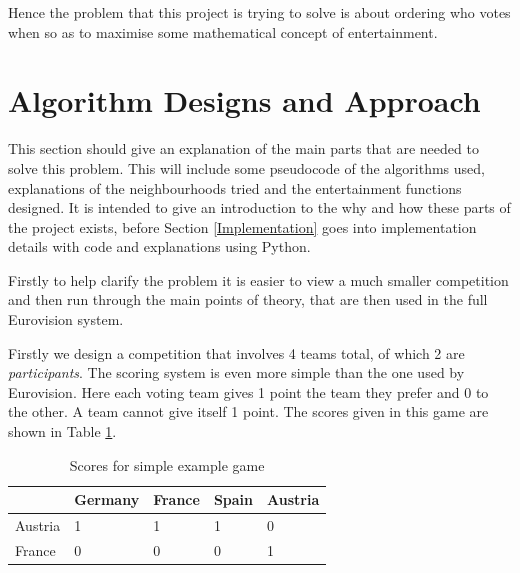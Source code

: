 \documentclass[12pt]{report}
\begin{document}
Hence the problem that this project is trying to solve is about ordering who votes when so as to maximise some mathematical concept of entertainment.

\clearpage
\section{Algorithm Designs and Approach}\label{AlgorithmDesigns}
This section should give an explanation of the main parts that are needed to solve this problem. This will include some pseudocode of the algorithms used, explanations of the neighbourhoods tried and the entertainment functions designed. It is intended to give an introduction to the why and how these parts of the project exists, before Section \ref{Implementation} goes into implementation details with code and explanations using Python.

Firstly to help clarify the problem it is easier to view a much smaller competition and then run through the main points of theory, that are then used in the full Eurovision system.

Firstly we design a competition that involves 4 teams total, of which 2 are \textit{participants}. The scoring system is even more simple than the one used by Eurovision. Here each voting team gives 1 point the team they prefer and 0 to the other. A team cannot give itself 1 point. The scores given in this game are shown in Table \ref{t_simpleMatrix}.

\begin{table}[H]
\centering
\caption{Scores for simple example game}
\label{t_simpleMatrix}
\begin{tabular}{|l|l|l|l|l|}
\hline
        & Germany & France & Spain & Austria \\ \hline
Austria & 1       & 1     & 1      & 0       \\ \hline
France  & 0       & 0     & 0      & 1       \\ \hline
\end{tabular}
\end{table}
\end{document}
